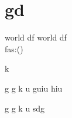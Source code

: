 \documentclass{article}
\begin{document}
\section{gd}
	world df \textbf{\gitRel}
	world df \textbf{\gitRel}\\
	fas:\gitRoff(\gitCommitterDate)\\
	\begin{changelog}[author=Michele]
		\begin{version}[version=1.20]
			\added
			\item k
		\end{version}
		
		\begin{version}[version=\gitReln]
			\added
			\item  g g k u guiu  hiu
		\end{version}
		
		\begin{version}[version=\gitReln]
			\added
			\item  g g k u sdg
		\end{version}
	\end{changelog}
\end{document}
